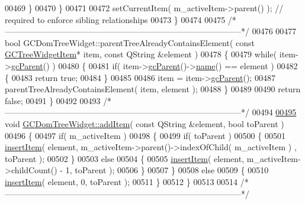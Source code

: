 \begin{DoxyCode}
00469     \}
00470   \}
00471 
00472   setCurrentItem( m\_activeItem->parent() );  \textcolor{comment}{// required to enforce sibling
       relationships}
00473 \}
00474 
00475 \textcolor{comment}{/*
      --------------------------------------------------------------------------------------*/}
00476 
00477 \textcolor{keywordtype}{bool} GCDomTreeWidget::parentTreeAlreadyContainsElement( \textcolor{keyword}{const} \hyperlink{class_g_c_tree_widget_item}{GCTreeWidgetItem}*
       item, \textcolor{keyword}{const} QString &element )
00478 \{
00479   \textcolor{keywordflow}{while}( item->\hyperlink{class_g_c_tree_widget_item_a1125dbc55a8ba3e50662b8258cb35fdf}{gcParent}() )
00480   \{
00481     \textcolor{keywordflow}{if}( item->\hyperlink{class_g_c_tree_widget_item_a1125dbc55a8ba3e50662b8258cb35fdf}{gcParent}()->\hyperlink{class_g_c_tree_widget_item_a3af8c66a690cd55986a38b996a375ba4}{name}() == element )
00482     \{
00483       \textcolor{keywordflow}{return} \textcolor{keyword}{true};
00484     \}
00485 
00486     item = item->\hyperlink{class_g_c_tree_widget_item_a1125dbc55a8ba3e50662b8258cb35fdf}{gcParent}();
00487     parentTreeAlreadyContainsElement( item, element );
00488   \}
00489 
00490   \textcolor{keywordflow}{return} \textcolor{keyword}{false};
00491 \}
00492 
00493 \textcolor{comment}{/*
      --------------------------------------------------------------------------------------*/}
00494 
\hypertarget{gcdomtreewidget_8cpp_source_l00495}{}\hyperlink{class_g_c_dom_tree_widget_adbbe1eeb6dc9a2d6c84a7133106a7f77}{00495} \textcolor{keywordtype}{void} \hyperlink{class_g_c_dom_tree_widget_adbbe1eeb6dc9a2d6c84a7133106a7f77}{GCDomTreeWidget::addItem}( \textcolor{keyword}{const} QString &element, \textcolor{keywordtype}{bool} toParent )
00496 \{
00497   \textcolor{keywordflow}{if}( m\_activeItem )
00498   \{
00499     \textcolor{keywordflow}{if}( toParent )
00500     \{
00501       \hyperlink{class_g_c_dom_tree_widget_a5e4117a9b47ac0bd520d32fc54d5f1ed}{insertItem}( element, m\_activeItem->parent()->indexOfChild( m\_activeItem )
      , toParent );
00502     \}
00503     \textcolor{keywordflow}{else}
00504     \{
00505       \hyperlink{class_g_c_dom_tree_widget_a5e4117a9b47ac0bd520d32fc54d5f1ed}{insertItem}( element, m\_activeItem->childCount() - 1, toParent );
00506     \}
00507   \}
00508   \textcolor{keywordflow}{else}
00509   \{
00510     \hyperlink{class_g_c_dom_tree_widget_a5e4117a9b47ac0bd520d32fc54d5f1ed}{insertItem}( element, 0, toParent );
00511   \}
00512 \}
00513 
00514 \textcolor{comment}{/*
      --------------------------------------------------------------------------------------*/}

\end{DoxyCode}
